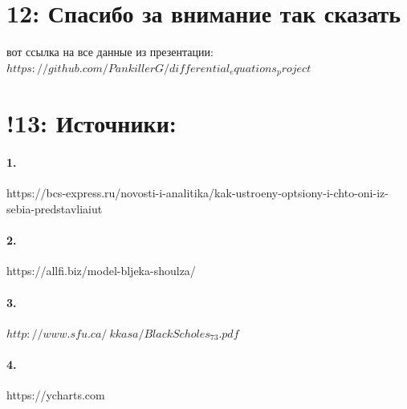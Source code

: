 \documentclass[a4paper]{article}
\begin{document}
\section*{12: Спасибо за внимание так сказать}
вот ссылка на все данные из презентации: \\
$https://github.com/PankillerG/differential_equations_project$
\section*{!13: Источники:}
\paragraph*{1.}
https://bcs-express.ru/novosti-i-analitika/kak-ustroeny-optsiony-i-chto-oni-iz-sebia-predstavliaiut
\paragraph*{2.}
https://allfi.biz/model-bljeka-shoulza/
\paragraph*{3.}
$http://www.sfu.ca/~kkasa/BlackScholes_73.pdf$
\paragraph*{4.}
https://ycharts.com
\end{document}
